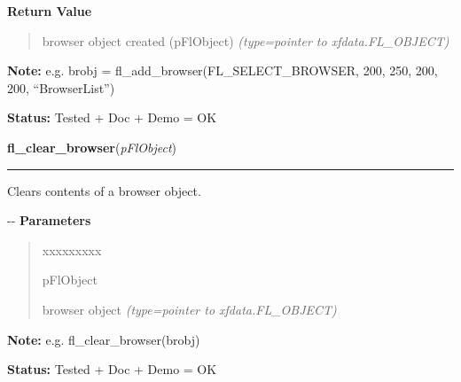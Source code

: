 \begin{boxedminipage}{\funcwidth}
      \textbf{Return Value}
    \vspace{-1ex}

      \begin{quote}

browser object created (pFlObject)
      {\it (type=pointer to xfdata.FL\_OBJECT)}

      \end{quote}

\textbf{Note:} 
e.g. brobj = fl\_add\_browser(FL\_SELECT\_BROWSER, 200, 250, 200, 200,
``BrowserList'')


\textbf{Status:} 
Tested + Doc + Demo = OK


    \end{boxedminipage}

    \label{xformslib:flbrowser:fl_clear_browser}

    \vspace{0.5ex}

\hspace{.8\funcindent}\begin{boxedminipage}{\funcwidth}

    \raggedright \textbf{fl\_clear\_browser}(\textit{pFlObject})

    \vspace{-1.5ex}

    \rule{\textwidth}{0.5\fboxrule}
\setlength{\parskip}{2ex}

Clears contents of a browser object.

-{}-
\setlength{\parskip}{1ex}
      \textbf{Parameters}
      \vspace{-1ex}

      \begin{quote}
        \begin{Ventry}{xxxxxxxxx}

          \item[pFlObject]


browser object
            {\it (type=pointer to xfdata.FL\_OBJECT)}

        \end{Ventry}

      \end{quote}

\textbf{Note:} 
e.g. fl\_clear\_browser(brobj)


\textbf{Status:} 
Tested + Doc + Demo = OK


    \end{boxedminipage}

